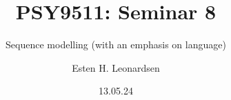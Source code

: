 \documentclass[10pt]{beamer}
\title{PSY9511: Seminar 8}
\subtitle{Sequence modelling (with an emphasis on language)}
\author{Esten H. Leonardsen}
\date{13.05.24}
\begin{document}
	\begin{frame}
	 	\titlepage
	\end{frame}







\end{document}
